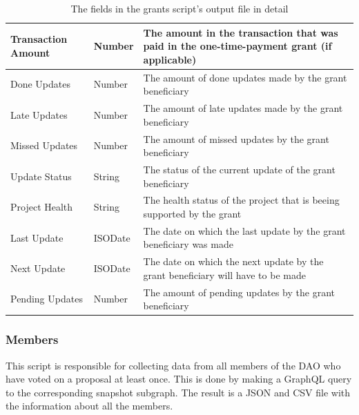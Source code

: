 \documentclass[MSE,Master,english]{twbook}%
\begin{document}
\begin{table}[H]
{\begin{tabular}{|l|l|l|}
  Transaction Amount & Number & The amount in the transaction that was paid in the one-time-payment grant (if applicable)           \\ \hline
  Done Updates                   & Number  & The amount of done updates made by the grant beneficiary                               \\ \hline
  Late Updates                   & Number  & The amount of late updates made by the grant beneficiary                               \\ \hline
  Missed Updates                 & Number  & The amount of missed updates by the grant beneficiary                                  \\ \hline
  Update Status                  & String  & The status of the current update of the grant beneficiary                              \\ \hline
  Project Health                 & String  & The health status of the project that is beeing supported by the grant                 \\ \hline
  Last Update                    & ISODate & The date on which the last update by the grant beneficiary was made                    \\ \hline
  Next Update                    & ISODate & The date on which the next update by the grant beneficiary will have to be made        \\ \hline
  Pending Updates                & Number  & The amount of pending updates by the grant beneficiary                                 \\ \hline
  \end{tabular}%
  }
  \caption{The fields in the grants script's output file in detail}
  \label{table:grants}
\end{table}

\subsubsection{Members}
This script is responsible for collecting data from all members of the DAO who have voted on a proposal at least once. This is done by making a GraphQL query to the corresponding snapshot subgraph. The result is a JSON and CSV file with the information about all the members. \\
\end{document}

